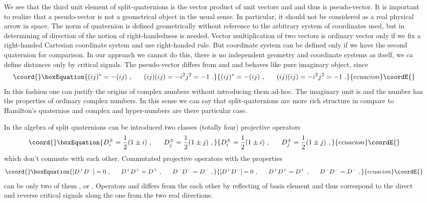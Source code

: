 \documentclass[a4paper,12pt]{article}
\begin{document}
We see that the third unit element \coordHE{} of split-quaternions is the vector product of 
unit vectors \coordHE{} and \coordHE{} and thus is pseudo-vector. It is important to realize that a 
pseudo-vector is not a geometrical object in the usual sense. In particular, it should 
not be considered as a real physical arrow in space. The norm of quaternion is defined 
geometrically without reference to the arbitrary system of coordinates used, but in 
determining of direction of \coordHE{} the notion of right-handedness is needed. Vector 
multiplication of two vectors is ordinary vector only if we fix a right-handed Cartesian 
coordinate system and use right-handed rule. But coordinate system can be defined only 
if we have the second quaternion for comparison. In our approach we cannot do this, there 
is no independent geometry and coordinate systems as itself, we ca define distances only 
by critical signals. The pseudo-vector \coordHE{} differs from \coordHE{} and \coordHE{} and behaves like 
pure imaginary object, since
\begin{equation}\coord{}\boxEquation{ \label{ij}
(ij)^* = - (ij) ~, ~~~~~ (ij)(ij) = - i^2j^2 = -1 ~.
}{ (ij)^* = - (ij) ~, ~~~~~ (ij)(ij) = - i^2j^2 = -1 ~.
}{ecuacion}\coordE{}\end{equation} 
In this fashion one can justify the origins of complex numbers without introducing them 
ad-hoc. The imaginary unit is \coordHE{} and the number \coordHE{} has the properties of 
ordinary complex numbers. In this sense we can say that split-quaternions are more rich 
structure in compare to Hamilton's quaternios and complex and hyper-numbers are there 
particular case.

In the algebra of split quaternions can be introduced two classes (totally four) 
projective operators 
\begin{equation}\coord{}\boxEquation{ \label{Dq}
D^\pm_i = \frac{1}{2}(1 \pm i) ~, ~~~~~ D^\pm_j = \frac{1}{2}(1 \pm j) ~, 
}{ D^\pm_i = \frac{1}{2}(1 \pm i) ~, ~~~~~ D^\pm_j = \frac{1}{2}(1 \pm j) ~, 
}{ecuacion}\coordE{}\end{equation}
which don't commute with each other. Commutated projective operators with the properties
\begin{equation}\coord{}\boxEquation{ \label{D12}
[D^+D^-] = 0 ~, ~~~~~ D^+D^+ = D^+~, ~~~~~ D^-D^- = D^-~, 
}{ [D^+D^-] = 0 ~, ~~~~~ D^+D^+ = D^+~, ~~~~~ D^-D^- = D^-~, 
}{ecuacion}\coordE{}\end{equation}
can be only two of them \coordHE{}, or \coordHE{}. Operators \coordHE{} and \coordHE{} differs from 
the each other by reflecting of basis element and thus correspond to the direct and 
reverse critical signals along the one from the two real directions. 
\end{document}
